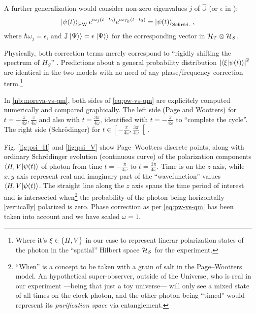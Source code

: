 A further generalization would consider non-zero eigenvalues $j$ of $\hat{\mathbb{J}}$
(or $\epsilon$ in \cite[eq. 16]{Lloyd:Time}):
\begin{equation}\label{eq:pw-vs-qm}
  \ket{\psi(t)}_{\mathrm{PW}} e^{i\omega_{j}(t - t_{0})} e^{i\omega_{T_0}(t - t_{0})} = \ket{\psi(t)}_{\mathrm{Schr\ddot{o}d.}} \,\text{,}
\end{equation}
where $\hbar\omega_j = \epsilon$,
and $\mathbb{J}\left.\left| \Psi \right\rangle\right\rangle = \epsilon \left.\left| \Psi \right\rangle\right\rangle$
for the corresponding vector in $\mathcal{H}_T \otimes \mathcal{H}_S$.

Physically, both correction terms merely
correspond to ``rigidly shifting the spectrum of $H_S$'' \parencite{Lloyd:Time}.
Predictions about a general probability distribution
$\abs{\braket{\xi}{\psi(t)}}^2$
are identical in the two models with no need of any phase/frequency correction term.\footnote{
  Where it's $\xi \in \qty{H, V}$
  in our case to represent linerar polarization states of the photon in
  the ``spatial'' Hilbert space $\mathcal{H}_S$
  for the experiment.
}

\begin{spacing}{1.5}
  In \ref{nb:moreva-vs-qm},
  both sides of \eqref{eq:pw-vs-qm} are
  explicitely computed numerically and compared graphically.
  The left side (Page and Wootters)
  for $t = -\frac{\pi}{4\omega}, \frac{\pi}{4\omega}$ and also with
  $t = \frac{3\pi}{4\omega}$, identified with $t = -\frac{\pi}{4\omega}$
  to ``complete the cycle''.
  The right side (Schr{\"o}dinger) for
  $t \in \left[-\frac{\pi}{4\omega}, \frac{3\pi}{4\omega}\right[$.
\end{spacing}

Fig. \ref{fig:psi_H} and \ref{fig:psi_V} show
Page--Wootters discrete points, along with
ordinary Schr{\"o}dinger evolution (continuous curve)
of the polarization components
$\braket{H,V}{\psi(t)}$ of photon
from time $t = -\frac{\pi}{4\omega}$
to $t = \frac{3\pi}{4\omega}$. Time is on the $z$ axis,
while $x, y$ axis represent real and imaginary part of
the ``wavefunction'' values $\braket{H,V}{\psi(t)}$.
The straight line along the $z$ axis
spans the time period of interest
and is intersected when\footnote{
  ``When'' is a concept to be taken with a grain of salt in the Page--Wootters model.
  An hypothetical super-observer, outside of the Universe,
  who is real in our experiment ---being that just a toy universe---
  will only see a mixed state of all times on the clock photon, and the other
  photon being ``timed'' would represent its \emph{purification space}
  via entanglement.
}
the probability of the photon being
horizontally [vertically] polarized is zero.
Phase correction as per \eqref{eq:pw-vs-qm} has been taken into account
and we have scaled $\omega=1$.

